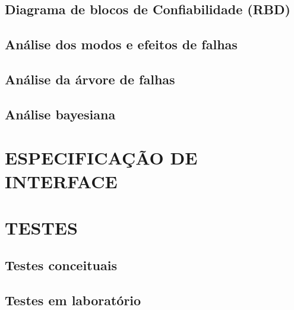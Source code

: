 \section{Diagrama de blocos de Confiabilidade (RBD)}
\label{sec:rbd}

\section{Análise dos modos e efeitos de falhas}
\label{sec:conffmeca}

\section{Análise da árvore de falhas}
\label{sec:conffta}

\section{Análise bayesiana}
\label{sec:bayes}

\chapter{ESPECIFICAÇÃO DE INTERFACE}
\label{chap:espint}

\chapter{TESTES}
\label{chap:testes}

\section{Testes conceituais}
\label{sec:tstconc}

\section{Testes em laboratório}
\label{sec:tstlab}

